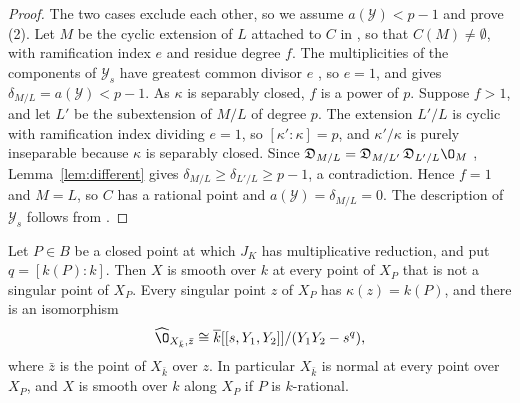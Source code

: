 \begin{proof}
The two cases exclude each other, so we assume $a(\mathcal Y)<p-1$ and prove \textup{(2)}.
Let $M$ be the cyclic extension of $L$ attached to $C$ in \cite[Proposition~8.3(a)]{LLR04}, so that $C(M)\neq\emptyset$, with ramification index $e$ and residue degree $f$.
The multiplicities of the components of $\mathcal Y_s$ have greatest common divisor $e$ \cite[before Proposition~8.11]{LLR04}, so $e = 1$, and \cite[Proposition~8.11(b)]{LLR04} gives $\delta_{M/L} = a(\mathcal Y)<p-1$.
As $\kappa$ is separably closed, $f$ is a power of $p$.
Suppose $f>1$, and let $L'$ be the subextension of $M/L$ of degree $p$.
The extension $L'/L$ is cyclic with ramification index dividing $e = 1$, so $[\kappa':\kappa] = p$, and $\kappa'/\kappa$ is purely inseparable because $\kappa$ is separably closed.
Since $\mathfrak D_{M/L} = \mathfrak D_{M/L'}\,\mathfrak D_{L'/L}\O_M$ \cite[III, \S4, Proposition~8]{Ser79}, Lemma~\ref{lem:different} gives $\delta_{M/L}\geq\delta_{L'/L}\geq p-1$, a contradiction.
Hence $f = 1$ and $M = L$, so $C$ has a rational point and $a(\mathcal Y) = \delta_{M/L} = 0$.
The description of $\mathcal Y_s$ follows from \cite[Proposition~8.3(b)]{LLR04}.
\end{proof}

\begin{lemma}\label{lem:multiplicative}
Let $P\in B$ be a closed point at which $J_K$ has multiplicative reduction, and put $q = [k(P):k]$.
Then $X$ is smooth over $k$ at every point of $X_P$ that is not a singular point of $X_P$.
Every singular point $z$ of $X_P$ has $\kappa(z) = k(P)$, and there is an isomorphism
\[
  \widehat\O_{X_{\bar k},\bar z}\cong\overline k[[s,Y_1,Y_2]]/(Y_1Y_2-s^q),
\]
where $\bar z$ is the point of $X_{\bar k}$ over $z$.
In particular $X_{\bar k}$ is normal at every point over $X_P$, and $X$ is smooth over $k$ along $X_P$ if $P$ is $k$-rational.
\end{lemma}


